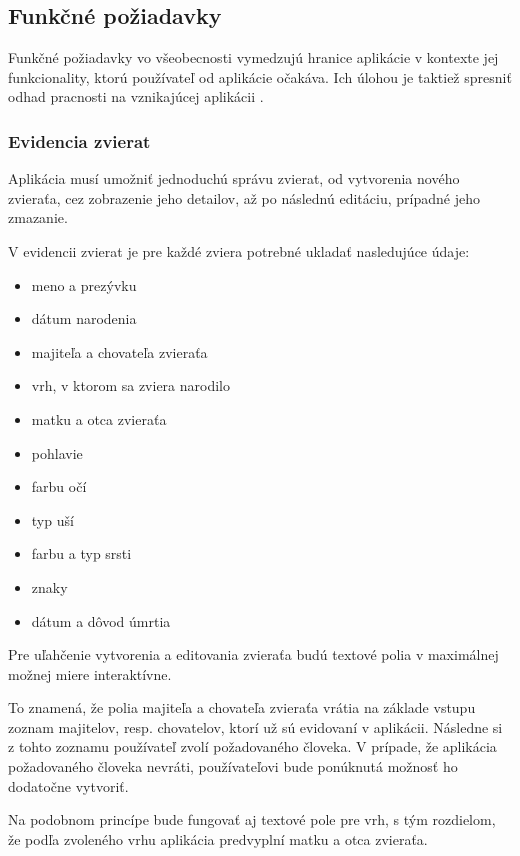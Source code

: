 \subsection{Funkčné požiadavky}\label{funkcne-poziadavky}
Funkčné požiadavky vo všeobecnosti vymedzujú hranice aplikácie v kontexte jej funkcionality, ktorú používateľ od aplikácie očakáva. Ich úlohou je taktiež spresniť odhad pracnosti na vznikajúcej aplikácii \cite{funkcne-a-nefunkcne-poziadavky}.

\subsubsection{Evidencia zvierat}\label{evidencia-zvierat}
Aplikácia musí umožniť jednoduchú správu zvierat, od vytvorenia nového zvieraťa, cez zobrazenie jeho detailov, až po následnú editáciu, prípadné jeho zmazanie.

\hfill \break
V evidencii zvierat je pre každé zviera potrebné ukladať nasledujúce údaje:

\begin{itemize}
	\item meno a prezývku
	\item dátum narodenia
	\item majiteľa a chovateľa zvieraťa
	\item vrh, v ktorom sa zviera narodilo
	\item matku a otca zvieraťa
	\item pohlavie
	\item farbu očí
	\item typ uší
	\item farbu a typ srsti
	\item znaky
	\item dátum a dôvod úmrtia
\end{itemize}

Pre uľahčenie vytvorenia a editovania zvieraťa budú textové polia v maximálnej možnej miere interaktívne.

To znamená, že polia majiteľa a chovateľa zvieraťa vrátia na základe vstupu zoznam majitelov, resp. chovatelov, ktorí už sú evidovaní v aplikácii. Následne si z tohto zoznamu používateľ zvolí požadovaného človeka.
V prípade, že aplikácia požadovaného človeka nevráti, používateľovi bude ponúknutá možnosť ho dodatočne vytvoriť.

Na podobnom princípe bude fungovať aj textové pole pre vrh, s tým rozdielom, že podľa zvoleného vrhu aplikácia predvyplní matku a otca zvieraťa.
 
